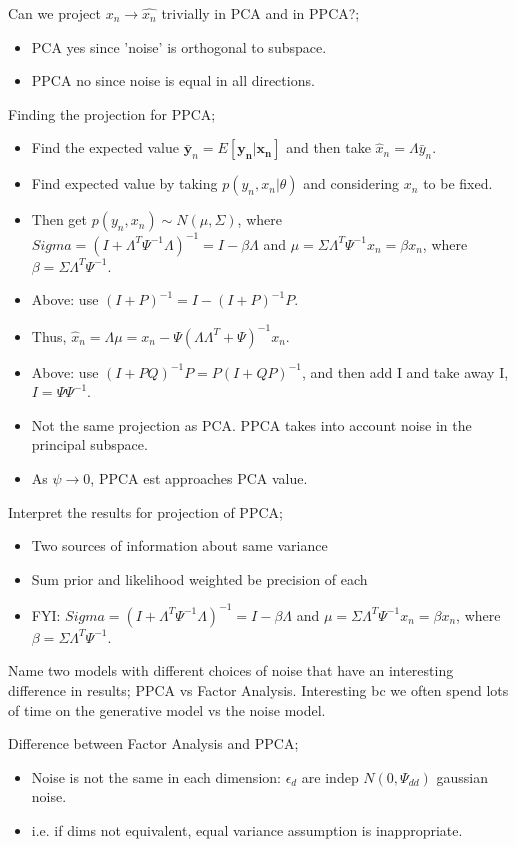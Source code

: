 \documentclass{article}
\begin{document}
Can we project $x_n \rightarrow \hat{x_n}$ trivially in PCA and in PPCA?; \begin{itemize} \item PCA yes since 'noise' is orthogonal to subspace.  \item PPCA no since noise is equal in all directions.  \end{itemize} Finding the projection for PPCA; \begin{itemize} \item Find the expected value $\mathbf{\bar{y}}_n=E[\mathbf{y_n|x_n}]$ and then take $\hat{x}_n=\Lambda\bar{y}_n$.  \item Find expected value by taking $p(y_n, x_n|\theta)$ and considering $x_n$ to be fixed.  \item Then get $p(y_n, x_n) \sim N(\mu, \Sigma)$, where $Sigma = (I+\Lambda^T\Psi^{-1}\Lambda)^{-1}=I-\beta\Lambda$ and $\mu=\Sigma\Lambda^T\Psi^{-1}x_n=\beta x_n$, where $\beta = \Sigma\Lambda^T\Psi^{-1}$.  \item Above: use $(I+P)^{-1}=I-(I+P)^{-1}P$.  \item Thus, $\hat{x}_n=\Lambda\mu=x_n - \Psi(\Lambda\Lambda^T+\Psi)^{-1}x_n$.  \item Above: use $(I+PQ)^{-1}P=P(I+QP)^{-1}$, and then add I and take away I, $I=\Psi\Psi^{-1}$.  \item Not the same projection as PCA. PPCA takes into account noise in the principal subspace.  \item As $\psi\rightarrow 0$, PPCA est approaches PCA value.  \end{itemize}

Interpret the results for projection of PPCA; \begin{itemize} \item Two sources of information about same variance \item Sum prior and likelihood weighted be precision of each \item FYI: $Sigma = (I+\Lambda^T\Psi^{-1}\Lambda)^{-1}=I-\beta\Lambda$ and $\mu=\Sigma\Lambda^T\Psi^{-1}x_n=\beta x_n$, where $\beta = \Sigma\Lambda^T\Psi^{-1}$.	\end{itemize}

Name two models with different choices of noise that have an interesting difference in results; PPCA vs Factor Analysis. \newline Interesting bc we often spend lots of time on the generative model vs the noise model.

Difference between Factor Analysis and PPCA; \begin{itemize} \item Noise is not the same in each dimension: $\epsilon_d$ are indep $N(0,\Psi_{dd})$ gaussian noise.  \item i.e. if dims not equivalent, equal variance assumption is inappropriate.  \end{itemize}
\end{document}
